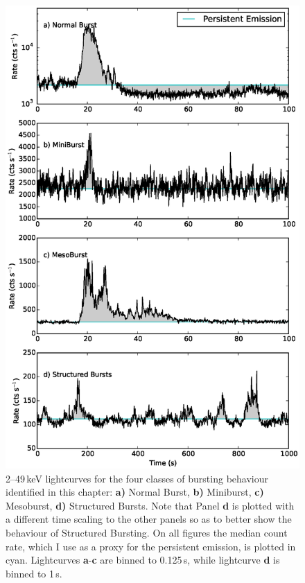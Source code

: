 \begin{figure}
  \centering
  \includegraphics[width=.9\linewidth, trim={0.7cm 2.1cm 1.5cm 3.4cm},clip]{images/comp_bursts.eps}
  \caption[Lightcurves for the four classes of bursting behaviour identified in the Bursting Pulsar.]{\small 2--49\,keV lightcurves for the four classes of bursting behaviour identified in this chapter: \textbf{a)} Normal Burst, \textbf{b)} Miniburst, \textbf{c)} Mesoburst, \textbf{d)} Structured Bursts.  Note that Panel \textbf{d} is plotted with a different time scaling to the other panels so as to better show the behaviour of Structured Bursting.  On all figures the median count rate, which I use as a proxy for the persistent emission, is plotted in cyan.  Lightcurves \textbf{a}-\textbf{c} are binned to 0.125\,s, while lightcurve \textbf{d} is binned to 1\,s.}
  \label{fig:classes}
\end{figure}

